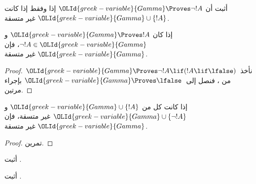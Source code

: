 \documentclass[../../../include/open-logic-section]{subfiles}
\begin{document}
\begin{prob}
أثبت أن $\OLId{greek-variable}{Gamma} \Proves \lnot !A$ إذا وفقط إذا كانت
$\OLId{greek-variable}{Gamma} \cup \{!A\}$ غير متسقة.
\end{prob}

\begin{prop}
  إذا كان $\OLId{greek-variable}{Gamma} \Proves !A$ و$\lnot !A \in \OLId{greek-variable}{Gamma}$، فإن $\OLId{greek-variable}{Gamma}$
  غير متسقة.
\end{prop}

\begin{proof}
  نأخذ~$\OLId{greek-variable}{Gamma} \Proves \lnot !A \lif (!A \lif \lfalse)$ من
  ، فنصل إلى~$\OLId{greek-variable}{Gamma} \Proves \lfalse$
  بإجراء  مرتين.
\end{proof}


\begin{prop}
  إذا كانت كل من $\OLId{greek-variable}{Gamma} \cup \{!A\}$ و$\OLId{greek-variable}{Gamma} \cup \{\lnot !A\}$
  غير متسقة، فإن $\OLId{greek-variable}{Gamma}$ غير متسقة.
\end{prop}

\begin{proof}
تمرين.
\end{proof}

\begin{prob}
  أثبت .
\end{prob}
\tagendprob

\begin{prob}
  أثبت .
\end{prob}
\tagendprob
\end{document}
